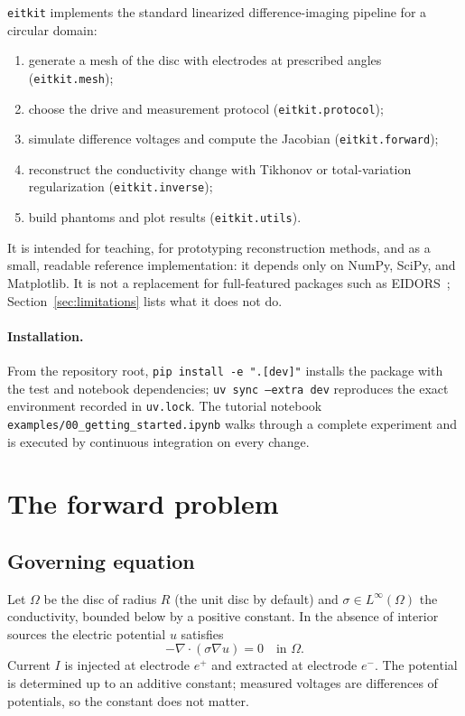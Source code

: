 \documentclass[11pt,a4paper]{article}
\newcommand{\code}[1]{\texttt{#1}}
\begin{document}
\texttt{eitkit} implements the standard linearized difference-imaging
pipeline for a circular domain:
\begin{enumerate}
  \item generate a mesh of the disc with electrodes at prescribed angles
        (\code{eitkit.mesh});
  \item choose the drive and measurement protocol (\code{eitkit.protocol});
  \item simulate difference voltages and compute the Jacobian
        (\code{eitkit.forward});
  \item reconstruct the conductivity change with Tikhonov or total-variation
        regularization (\code{eitkit.inverse});
  \item build phantoms and plot results (\code{eitkit.utils}).
\end{enumerate}
It is intended for teaching, for prototyping reconstruction methods, and as a
small, readable reference implementation: it depends only on NumPy, SciPy,
and Matplotlib. It is not a replacement for full-featured packages such as
EIDORS~\cite{AdlerLionheart2006}; Section~\ref{sec:limitations} lists what it
does not do.

\paragraph{Installation.} From the repository root,
\code{pip install -e ".[dev]"} installs the package with the test and
notebook dependencies; \code{uv sync --extra dev} reproduces the exact
environment recorded in \code{uv.lock}. The tutorial notebook
\code{examples/00\_getting\_started.ipynb} walks through a complete
experiment and is executed by continuous integration on every change.

\section{The forward problem}

\subsection{Governing equation}

Let $\Omega$ be the disc of radius $R$ (the unit disc by default) and
$\sigma\in L^\infty(\Omega)$ the conductivity, bounded below by a positive
constant. In the absence of interior sources the electric potential $u$
satisfies
\begin{equation}\label{eq:pde}
  -\nabla\cdot(\sigma\nabla u) = 0 \quad\text{in } \Omega .
\end{equation}
Current $I$ is injected at electrode $e^+$ and extracted at electrode $e^-$.
The potential is determined up to an additive constant; measured voltages are
differences of potentials, so the constant does not matter.
\end{document}
